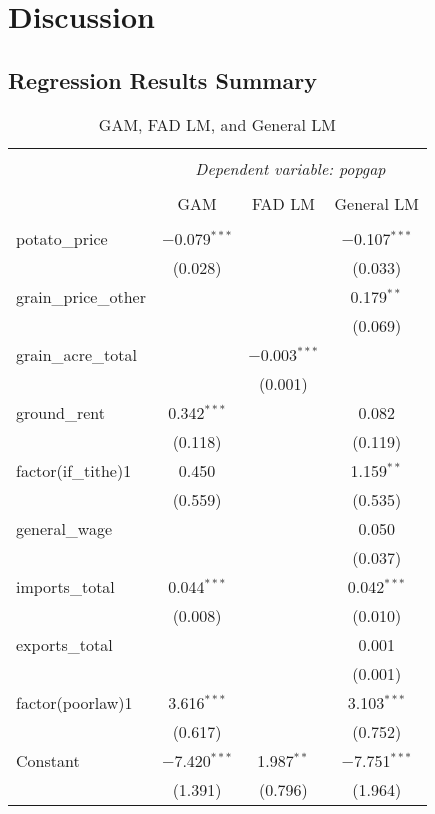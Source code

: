 \chapter{Discussion}


\section{Regression Results Summary}
\begin{table}[!htbp]
    \centering
    \caption{GAM, FAD LM, and General LM}
    \label{tab:combined_regression}
    \begin{tabular}{@{\extracolsep{5pt}}lccc}
    \\[-1.8ex]\hline
    \hline \\[-1.8ex]
    & \multicolumn{3}{c}{\textit{Dependent variable: popgap}} \\
    \cline{2-4}
    \\[-1.8ex] & GAM & FAD LM & General LM \\
    \hline \\[-1.8ex]
    potato\_price & $-$0.079$^{***}$ & & $-$0.107$^{***}$ \\
     & (0.028) & & (0.033) \\
    grain\_price\_other & &  & 0.179$^{**}$ \\
     & &  & (0.069) \\
    grain\_acre\_total & & $-$0.003$^{***}$ & \\
     & & (0.001) & \\
    ground\_rent & 0.342$^{***}$ & & 0.082 \\
     & (0.118) & & (0.119) \\
    factor(if\_tithe)1 & 0.450 & & 1.159$^{**}$ \\
     & (0.559) & & (0.535) \\
    general\_wage & & & 0.050 \\
     & & & (0.037) \\
    imports\_total & 0.044$^{***}$ & & 0.042$^{***}$ \\
     & (0.008) & & (0.010) \\
    exports\_total & & & 0.001 \\
     & & & (0.001) \\
    factor(poorlaw)1 & 3.616$^{***}$ & & 3.103$^{***}$ \\
     & (0.617) & & (0.752) \\
    Constant & $-$7.420$^{***}$ & 1.987$^{**}$ & $-$7.751$^{***}$ \\
     & (1.391) & (0.796) & (1.964) \\

\end{tabular}
\end{table}
